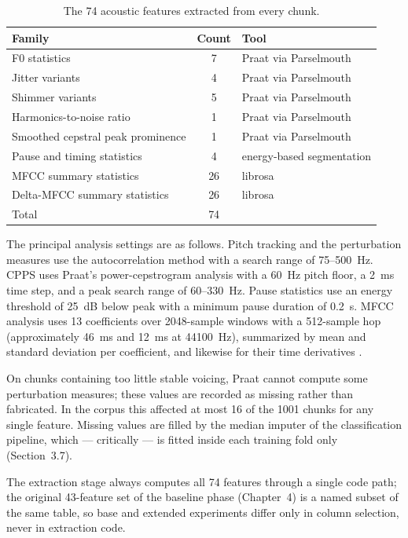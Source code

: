 \begin{table}[htb]
\centering
\caption{The 74 acoustic features extracted from every chunk.}
\label{tab:features}
\begin{tabular}{lcl}
\toprule
Family & Count & Tool \\
\midrule
F0 statistics & 7 & Praat via Parselmouth \\
Jitter variants & 4 & Praat via Parselmouth \\
Shimmer variants & 5 & Praat via Parselmouth \\
Harmonics-to-noise ratio & 1 & Praat via Parselmouth \\
Smoothed cepstral peak prominence & 1 & Praat via Parselmouth \\
Pause and timing statistics & 4 & energy-based segmentation \\
MFCC summary statistics & 26 & librosa \\
Delta-MFCC summary statistics & 26 & librosa \\
\midrule
Total & 74 & \\
\bottomrule
\end{tabular}
\end{table}

The principal analysis settings are as follows. Pitch tracking and the
perturbation measures use the autocorrelation method \cite{boersma1993}
with a search range of 75--500~Hz. CPPS uses Praat's power-cepstrogram
analysis with a 60~Hz pitch floor, a 2~ms time step, and a peak search
range of 60--330~Hz. Pause statistics use an energy threshold of 25~dB
below peak with a minimum pause duration of 0.2~s. MFCC analysis uses
13 coefficients over 2048-sample windows with a 512-sample hop
(approximately 46~ms and 12~ms at 44100~Hz), summarized by mean and
standard deviation per coefficient, and likewise for their time
derivatives \cite{davis1980,mcfee2015}.

On chunks containing too little stable voicing, Praat cannot compute
some perturbation measures; these values are recorded as missing rather
than fabricated. In the corpus this affected at most 16 of the 1001
chunks for any single feature. Missing values are filled by the median
imputer of the classification pipeline, which --- critically --- is
fitted inside each training fold only (Section~3.7).

The extraction stage always computes all 74 features through a single
code path; the original 43-feature set of the baseline phase
(Chapter~4) is a named subset of the same table, so base and extended
experiments differ only in column selection, never in extraction code.

